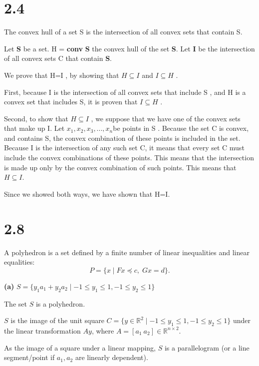 \documentclass{article}
\begin{document}
\section*{2.4}

The convex hull of a set S is the intersection of all convex sets that contain S. 

Let \textbf{S} be a set. H = \textbf{conv} \textbf{S} the convex hull of the set \textbf{S}. Let \textbf{I} be the intersection of all convex sets C that contain \textbf{S}.

We prove that H=I , by showing that $H \subseteq I   $  and $I \subseteq H   $  .

First, because I is the intersection of all convex sets that include S , and  H is a convex set that includes S, it is proven that  $I \subseteq H   $ .   

Second, to show that $H \subseteq I   $ , we suppose that we have one of the convex sets that make up I. Let $x_1 , x_2 , x_3 , ... ,x_n $be points in S . Because the set C is convex, and contains S, the convex combination of these points is included in the set.
Because I is the intersection of any such set C, it means that every set C must include the convex combinations of these points. This means that the intersection is made up only by the convex combination of such points. This means that $H \subseteq I$.


Since we showed both ways, we have shown that H=I.






\newpage

\section*{2.8}
A polyhedron is a set defined by a finite number of linear inequalities and linear equalities:
\[
P = \{x \mid Fx \preceq c,\; Gx = d\}.
\]



\textbf{(a)}
 $S = \{y_1 a_1 + y_2 a_2 \mid -1 \le y_1 \le 1, -1 \le y_2 \le 1\}$




 
 The set $S$ is a polyhedron.

 
 $S$ is the image of the unit square $C = \{y \in \mathbb{R}^2 \mid -1 \le y_1 \le 1, -1 \le y_2 \le 1\}$ under the linear transformation  $ Ay$, where $A = [a_1 \ a_2] \in \mathbb{R}^{n \times 2}$.
 
 As the image of a square under a linear mapping, $S$ is a parallelogram (or a line segment/point if $a_1, a_2$ are linearly dependent).
\end{document}
